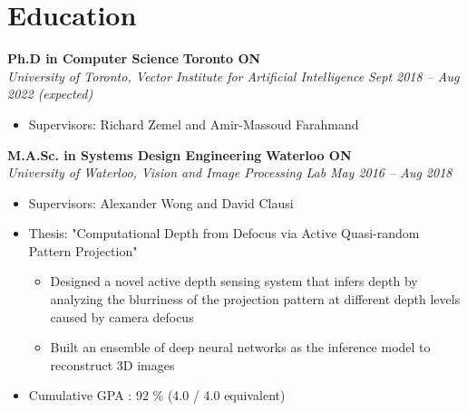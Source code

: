 \section*{Education}
\vspace{\postsubhead}
    \textbf{Ph.D in Computer Science}
    \hfill
    \textbf{Toronto ON}\\
    \textit{University of Toronto, Vector Institute for Artificial Intelligence}
    \hfill
    \textit{Sept 2018 -- Aug 2022 (expected)}
    \begin{itemize}
        \item Supervisors: Richard Zemel and Amir-Massoud Farahmand
    \end{itemize}
    \vspace{\interlist}
    
    \textbf{M.A.Sc. in Systems Design Engineering}
    \hfill
    \textbf{Waterloo ON}\\
    \textit{University of Waterloo, Vision and Image Processing Lab}
    \hfill
    \textit{May 2016 -- Aug 2018}
    \begin{itemize}
        \item Supervisors: Alexander Wong and David Clausi
        \item Thesis: "Computational Depth from Defocus via Active Quasi-random Pattern Projection"
        \begin{itemize}
            \item Designed a novel active depth sensing system that infers depth by analyzing the blurriness of the projection pattern at different depth levels caused by camera defocus
            \item Built an ensemble of deep neural networks as the inference model to reconstruct 3D images
        \end{itemize}
        \item Cumulative GPA : 92 \% (4.0 / 4.0 equivalent) 
    \end{itemize}
    \vspace{\interlist}

